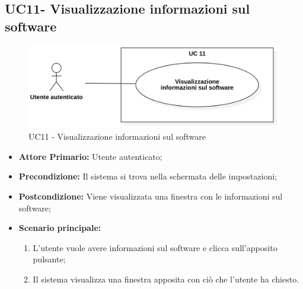 \subsection{UC11- Visualizzazione informazioni sul software}
\begin{figure}[H]
    \centering
    \includegraphics[scale = 0.7]{components/img/UC11.png}
    \caption{UC11 - Visualizzazione informazioni sul software}
\end{figure}
\begin{itemize}
\item \textbf{Attore Primario:} Utente autenticato;
\item \textbf{Precondizione:} Il sistema si trova nella schermata delle impostazioni;
\item \textbf{Postcondizione:} Viene visualizzata una finestra con le informazioni sul software;
\item \textbf{Scenario principale:}
    \begin{enumerate}
    \item L'utente vuole avere informazioni sul software e clicca sull'apposito pulsante;
    \item Il sistema visualizza una finestra apposita con ciò che l'utente ha chiesto.
    \end{enumerate}
\end{itemize}